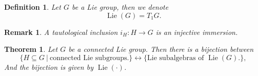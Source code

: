 \documentclass{article}
\newtheorem{theorem}{Theorem}[section]
\newtheorem{definition}{Definition}[section]
\newtheorem{remark}{Remark}[section]
\numberwithin{equation}{section}
\DeclareMathOperator{\Lie}{Lie}
\begin{document}
\begin{definition}
Let $G$ be a Lie group, then we denote 
\begin{equation*}
\Lie(G)=T_1G.
\end{equation*}
\end{definition}

\begin{remark}
A tautological inclusion $i_H:H\to G$ is an injective immersion.%
\end{remark}

\begin{theorem}
Let $G$ be a connected Lie group. Then there is a bijection between
\begin{equation*}
\{H\subseteq G\:|\: \text{connected Lie subgroups.}\}\leftrightarrow\{\text{Lie subalgebras of $\Lie(G)$.}\},
\end{equation*}
And the bijection is given by $\Lie(\cdot)$.
\end{theorem}
\end{document}
